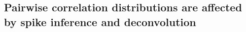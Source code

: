 \documentclass[a4paper,10pt,twocolumn]{article}
\begin{document}


\subsection{Pairwise correlation distributions are affected by spike inference and deconvolution}
\end{document}
